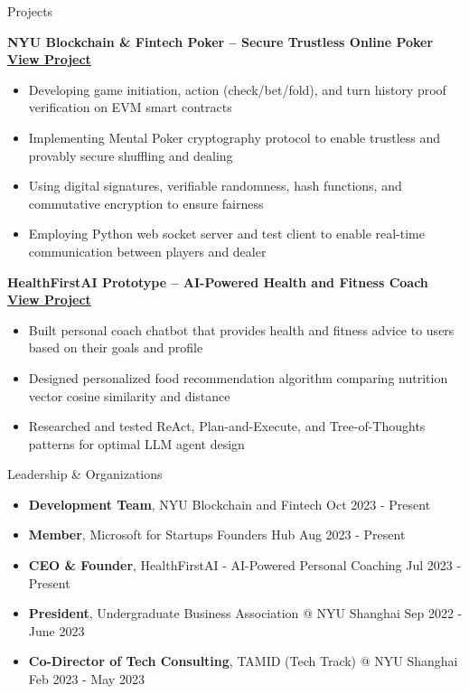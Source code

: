 \documentclass{resume} %
\begin{document}
\begin{rSection}{Projects}

	\textbf{NYU Blockchain \& Fintech Poker – Secure Trustless Online Poker \href{https://github.com/nyublockchainfintech/poker_dapp_backend}{View Project}}
	\begin{itemize}
		\item Developing game initiation, action (check/bet/fold), and turn history proof verification on EVM smart contracts
		\item Implementing Mental Poker cryptography protocol to enable trustless and provably secure shuffling and dealing
		\item Using digital signatures, verifiable randomness, hash functions, and commutative encryption to ensure fairness
		\item Employing Python web socket server and test client to enable real-time communication between players and dealer
	\end{itemize}

	\textbf{HealthFirstAI Prototype – AI-Powered Health and Fitness Coach \href{https://github.com/healthfirstai/prototype-backend}{View Project}}
	\begin{itemize}
		\item Built personal coach chatbot that provides health and fitness advice to users based on their goals and profile
		\item Designed personalized food recommendation algorithm comparing nutrition vector cosine similarity and distance
		\item Researched and tested ReAct, Plan-and-Execute, and Tree-of-Thoughts patterns for optimal LLM agent design
	\end{itemize}

\end{rSection}


\begin{rSection}{Leadership \& Organizations}
	\begin{itemize}
		\item \textbf{Development Team}{, NYU Blockchain and Fintech} \hfill Oct 2023 - Present
		\item \textbf{Member}{, Microsoft for Startups Founders Hub} \hfill Aug 2023 - Present
		\item \textbf{CEO \& Founder}{, HealthFirstAI - AI-Powered Personal Coaching} \hfill Jul 2023 - Present
		\item \textbf{President}{, Undergraduate Business Association @ NYU Shanghai} \hfill Sep 2022 - June 2023
		\item \textbf{Co-Director of Tech Consulting}{, TAMID (Tech Track) @ NYU Shanghai} \hfill Feb 2023 - May 2023
	\end{itemize}
\end{rSection}
\end{document}
